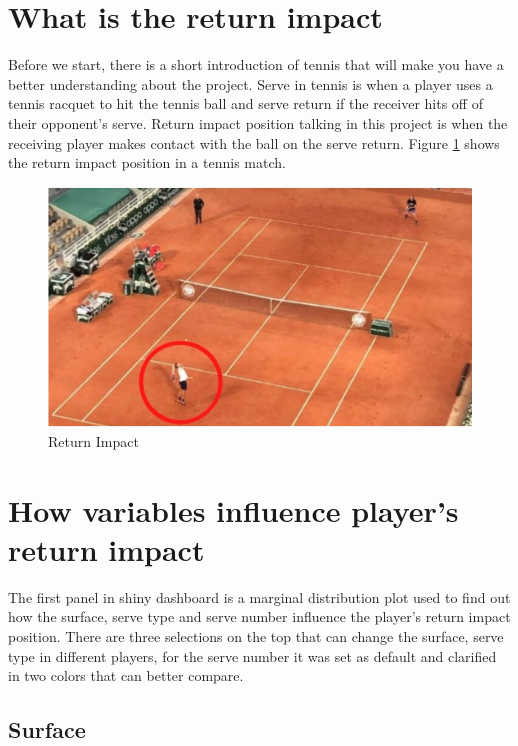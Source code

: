 \documentclass[11pt,a4paper,]{article}
\begin{document}
\hypertarget{what-is-the-return-impact}{%
\section{What is the return impact}\label{what-is-the-return-impact}}

Before we start, there is a short introduction of tennis that will make you have a better understanding about the project. Serve in tennis is when a player uses a tennis racquet to hit the tennis ball and serve return if the receiver hits off of their opponent's serve. Return impact position talking in this project is when the receiving player makes contact with the ball on the serve return. Figure \ref{fig:returnimpact} shows the return impact position in a tennis match.

\begin{figure}

{\centering \includegraphics[width=0.7\linewidth]{image/returnimpact} 

}

\caption{Return Impact}\label{fig:returnimpact}
\end{figure}

\hypertarget{how-variables-influence-players-return-impact}{%
\section{How variables influence player's return impact}\label{how-variables-influence-players-return-impact}}

The first panel in shiny dashboard is a marginal distribution plot used to find out how the surface, serve type and serve number influence the player's return impact position. There are three selections on the top that can change the surface, serve type in different players, for the serve number it was set as default and clarified in two colors that can better compare.

\hypertarget{surface}{%
\subsection{Surface}\label{surface}}
\end{document}
